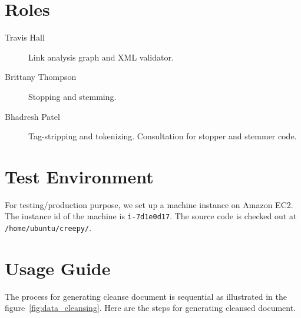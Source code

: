 \documentclass[letterpaper,11pt,twoside]{article}
\begin{document}
\section{Roles}
\begin{description}
 \item[Travis Hall] Link analysis graph and XML validator.
 \item[Brittany Thompson] Stopping and stemming.
 \item[Bhadresh Patel] Tag-stripping and tokenizing. Consultation for stopper and stemmer code.
\end{description}

\section{Test Environment}
For testing/production purpose, we set up a machine instance on Amazon EC2. The instance id of the machine is \texttt{i-7d1e0d17}. The source code is checked out at \texttt{/home/ubuntu/creepy/}.

\section{Usage Guide}
The process for generating cleanse document is sequential as illustrated in the figure~\ref{fig:data_cleansing}. Here are the steps for generating cleansed document.
\end{document}
